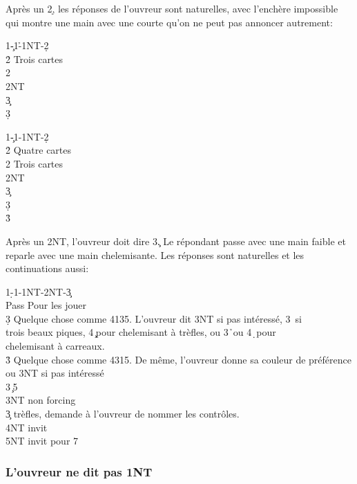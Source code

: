 \documentclass[a4paper]{article}
\begin{document}
Après un 2\d , les réponses de l'ouvreur sont naturelles, avec l'enchère impossible
qui montre une main avec une courte qu'on ne peut pas annoncer autrement:

\begin{bidtable}
1\c-1\h-1NT-2\d\+\\
2\h \> Trois cartes\\
2\s {}\\
2NT \\
3\c {}\\
3\d {}\-
\end{bidtable}

\begin{bidtable}
1\c-1\s-1NT-2\d\+\\
2\h \> Quatre cartes\\
2\s \> Trois cartes\\
2NT \\
3\c {}\\
3\d {}\\
3\h {}\-
\end{bidtable}

Après un 2NT, l'ouvreur doit dire 3\c . Le répondant passe avec une main faible
et reparle avec une main chelemisante. Les réponses sont naturelles et les
continuations aussi:

\begin{bidtable}
1\d-1\s-1NT-2NT-3\c\+\\
Pass \> Pour les jouer\\
3\d \> Quelque chose comme 4135. L'ouvreur dit 3NT si pas intéressé, 3\s\ si\\
\>trois beaux piques, 4\c\ pour chelemisant à trèfles, ou 3\h\ ou 4\d\ pour\\
\>chelemisant à carreaux.\\
3\h \> Quelque chose comme 4315. De même, l'ouvreur donne sa couleur de préférence\\
\>ou 3NT si pas intéressé\\
3\s {}\c\ 5\s \\
3NT  non forcing\\
3\c {} trèfles, demande à l'ouvreur de nommer les contrôles.\\
4NT  invit\\
5NT  invit pour 7\-
\end{bidtable}

\subsubsection{L'ouvreur ne dit pas 1NT}
\end{document}
